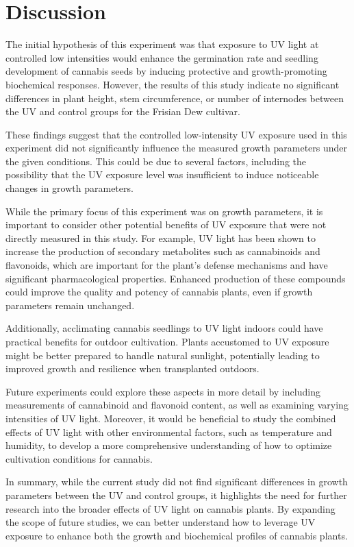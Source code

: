 \section{Discussion}

The initial hypothesis of this experiment was that exposure to UV light at controlled low intensities would enhance the germination rate and seedling development of cannabis seeds by inducing protective and growth-promoting biochemical responses. However, the results of this study indicate no significant differences in plant height, stem circumference, or number of internodes between the UV and control groups for the Frisian Dew cultivar.

These findings suggest that the controlled low-intensity UV exposure used in this experiment did not significantly influence the measured growth parameters under the given conditions. This could be due to several factors, including the possibility that the UV exposure level was insufficient to induce noticeable changes in growth parameters.

While the primary focus of this experiment was on growth parameters, it is important to consider other potential benefits of UV exposure that were not directly measured in this study. For example, UV light has been shown to increase the production of secondary metabolites such as cannabinoids and flavonoids, which are important for the plant's defense mechanisms and have significant pharmacological properties. Enhanced production of these compounds could improve the quality and potency of cannabis plants, even if growth parameters remain unchanged.

Additionally, acclimating cannabis seedlings to UV light indoors could have practical benefits for outdoor cultivation. Plants accustomed to UV exposure might be better prepared to handle natural sunlight, potentially leading to improved growth and resilience when transplanted outdoors.

Future experiments could explore these aspects in more detail by including measurements of cannabinoid and flavonoid content, as well as examining varying intensities of UV light. Moreover, it would be beneficial to study the combined effects of UV light with other environmental factors, such as temperature and humidity, to develop a more comprehensive understanding of how to optimize cultivation conditions for cannabis.

In summary, while the current study did not find significant differences in growth parameters between the UV and control groups, it highlights the need for further research into the broader effects of UV light on cannabis plants. By expanding the scope of future studies, we can better understand how to leverage UV exposure to enhance both the growth and biochemical profiles of cannabis plants.